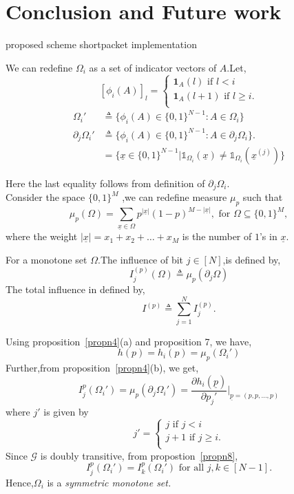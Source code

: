 \documentclass[
11pt, %
a4paper, %
oneside, %
headinclude,footinclude, %
BCOR5mm, %
]{scrartcl}
\begin{document}
\section{Conclusion and Future work}
proposed scheme
shortpacket
implementation
\begin{definition}
We can redefine $\Omega_i$ as a set of indicator vectors of $A$.Let,
\[
    [\phi_i(A)]_l=\left\{
                \begin{array}{ll}
                  \mathbf{1}_A(l) \text{ if } l < i\\
                  \mathbf{1}_A(l+1) \text{ if } l \ge i.\\
                \end{array}
              \right.
  \]
\begin{align*}
\Omega_i' &\triangleq \{\phi_i(A) \in \{0,1\}^{N-1} : A \in \Omega_i\}\\
\partial_j\Omega_i' &\triangleq \{\phi_i(A) \in \{0,1\}^{N-1}: A \in \partial_j\Omega_i\}.\\& =\{\underline{x} \in \{0,1\}^{N-1} | \mathbb{1}_{\Omega_i}(\underline{x}) \neq  \mathbb{1}_{\Omega_i}(\underline{x}^{(j)})\}
\end{align*}
\label{defn13}
\end{definition}
Here the last equality follows from definition of $\partial_j\Omega_i$.\\
Consider the space $\{0,1\}^M$ ,we can redefine measure $\mu_p$ such that $$\mu_p(\Omega) = \sum_{\underline{x} \in \Omega} p^{|\underline{x}|}(1-p)^{M-|\underline{x}|}, \text{ for }\Omega \subseteq \{0,1\}^M,$$ where the weight $|\underline{x}| = x_1 + x_2 + \ldots + x_M$ is the number of $1$'s in $\underline{x}$. 
\begin{definition}
For a monotone set $\Omega$.The influence of bit $j \in [N]$,is defined by,
$$I_j^{(p)}(\Omega)\triangleq \mu_p(\partial_j\Omega)$$
The total influence in defined by,
$$I^{(p)}\triangleq \sum^N_{j=1}I_j^{(p)}.$$
\label{defn15}
\end{definition}
Using proposition~\ref{propn4}(a) and proposition 7, we have, 
$$h(p)=h_i(p)=\mu_p(\Omega_i')$$
Further,from proposition~\ref{propn4}(b), we get,
$$I_j^{p}(\Omega_i')=\mu_p(\partial_j\Omega_i') = \frac{\partial h_i(\underline{p})}{\partial p_j'}\Bigg|_{\underline{p}=(p,p,\ldots,p)}$$
where $j'$ is given by 
\[
    j'=\left\{
                \begin{array}{ll}
                  j \text{ if } j < i\\
                  j+1 \text{ if } j \ge i.\\
                \end{array}
              \right.
  \]
Since $\mathcal{G}$ is doubly transitive, from propostion~\ref{propn8}, $$I_j^{p}(\Omega_i') = I_k^{p}(\Omega_i') \text{ for all } j,k \in [N-1].$$
Hence,$\Omega_i$ is a \emph{symmetric monotone set.}
\end{document}
